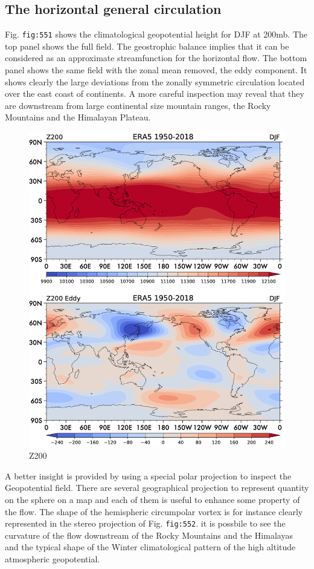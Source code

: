 \subsection{The horizontal general
circulation}\label{the-horizontal-general-circulation}

Fig. \texttt{fig:551} shows the climatological geopotential height for
DJF at 200mb. The top panel shows the full field. The geostrophic
balance implies that it can be considered as an approximate
streamfunction for the horizontal flow. The bottom panel shows the same
field with the zonal mean removed, the eddy component. It shows clearly
the large deviations from the zonally symmetric circulation located over
the east coast of continents. A more careful inspection may reveal that
they are downstream from large continental size mountain ranges, the
Rocky Mountains and the Himalayan Plateau.

\begin{figure}[h!]
    \centering
    \includegraphics[width=0.5\linewidth]{uploads/Screenshot 2024-11-19 132329.png}
    \caption{Z200}
    \label{fig:enter-label}
\end{figure}

A better insight is provided by using a special polar projection to
inspect the Geopotential field. There are several geographical
projection to represent quantity on the sphere on a map and each of them
is useful to enhance some property of the flow. The shape of the
hemispheric circumpolar vortex is for instance clearly represented in
the stereo projection of Fig. \texttt{fig:552}. it is possbile to see
the curvature of the flow downstream of the Rocky Mountains and the
Himalayas and the typical shape of the Winter climatological pattern of
the high altitude atmospheric geopotential.

